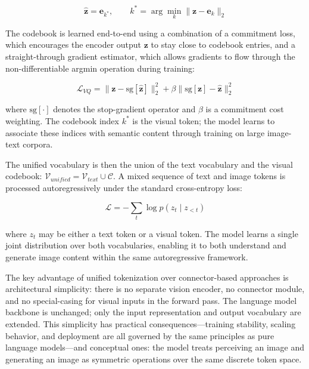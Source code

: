 \documentclass{book}
\begin{document}
\begin{equation}
\hat{\mathbf{z}} = \mathbf{e}_{k^*}, \qquad
k^* = \arg\min_k \|\mathbf{z} - \mathbf{e}_k\|_2
\end{equation}

The codebook is learned end-to-end using a combination of a commitment loss,
which encourages the encoder output $\mathbf{z}$ to stay close to codebook
entries, and a straight-through gradient estimator, which allows gradients to
flow through the non-differentiable argmin operation during training:

\begin{equation}
\mathcal{L}_{VQ} = \|\mathbf{z} - \text{sg}[\hat{\mathbf{z}}]\|_2^2
                 + \beta \|\text{sg}[\mathbf{z}] - \hat{\mathbf{z}}\|_2^2
\end{equation}

where $\text{sg}[\cdot]$ denotes the stop-gradient operator and $\beta$
is a commitment cost weighting. The codebook index $k^*$ is the visual token;
the model learns to associate these indices with semantic content through
training on large image-text corpora.

The unified vocabulary is then the union of the text vocabulary and the visual
codebook: $\mathcal{V}_{unified} = \mathcal{V}_{text} \cup \mathcal{C}$. A
mixed sequence of text and image tokens is processed autoregressively under the
standard cross-entropy loss:

\begin{equation}
\mathcal{L} = -\sum_t \log p(z_t \mid z_{<t})
\end{equation}

where $z_t$ may be either a text token or a visual token. The model learns
a single joint distribution over both vocabularies, enabling it to both
understand and generate image content within the same autoregressive framework.

The key advantage of unified tokenization over connector-based approaches is
architectural simplicity: there is no separate vision encoder, no connector
module, and no special-casing for visual inputs in the forward pass. The
language model backbone is unchanged; only the input representation and output
vocabulary are extended. This simplicity has practical consequences---training
stability, scaling behavior, and deployment are all governed by the same
principles as pure language models---and conceptual ones: the model treats
perceiving an image and generating an image as symmetric operations over the
same discrete token space.
\end{document}

